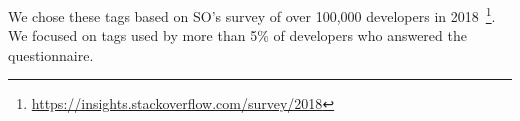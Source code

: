 \documentclass[conference]{IEEEtran}
\begin{document}
We chose these tags based on SO's survey of over 100,000 developers in 2018~\footnote{\url{https://insights.stackoverflow.com/survey/2018}}. We focused on tags used by more than 5\% of developers who answered the questionnaire. 



\end{document}
